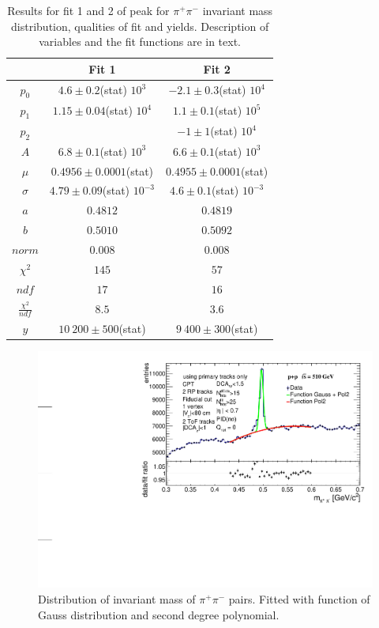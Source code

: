 \FloatBarrier
\begin{table}[ht]
    \centering
        \begin{tabular}{c|c|c}
             & Fit 1 & Fit 2 \\ \hline
           $p_0$ & $4.6 \pm 0.2$(stat) $10^{3}$ & $-2.1 \pm 0.3$(stat) $10^{4}$ \\ \hline
           $p_1$ & $1.15 \pm 0.04$(stat) $10^4$ & $1.1 \pm 0.1$(stat) $10^5$\\ \hline
           $p_2$ & & $-1 \pm 1$(stat) $10^4$ \\ \hline
           $A$ & $6.8 \pm 0.1$(stat) $10^3$ &  $6.6 \pm 0.1$(stat) $10^3$ \\ \hline
           $\mu$ & $0.4956 \pm 0.0001$(stat) &  $0.4955 \pm 0.0001$(stat) \\ \hline
           $\sigma$ & $4.79 \pm 0.09$(stat) $10^{-3}$ &  $4.6 \pm 0.1$(stat) $10^{-3}$ \\ \hline
           $a$ & $0.4812$ & $0.4819$\\ \hline
           $b$ & $0.5010$ & $0.5092$ \\ \hline
           $norm$ & $0.008$ & $0.008$ \\ \hline
           $\chi^2$ & $145$ & $57$ \\ \hline
           $ndf$ & $17$  & $16$ \\ \hline
           $\frac{\chi^2}{ndf}$ & $8.5$ & $3.6$  \\ \hline
           $y$ & $10~200 \pm 500$(stat) & $9~400 \pm 300$(stat)
        \end{tabular}
    \caption[Results for fit 1 and 2 of invariant mass of $\pi^+ \pi^-$ pairs]{Results for fit 1 and 2 of peak for $\pi^+ \pi^-$ invariant mass distribution, qualities of fit and yields. Description of variables and the fit functions are in text.}
    \label{at1}
\end{table}
\FloatBarrier
\FloatBarrier
\begin{figure}[ht]
    \centering
        \includegraphics[width=1\textwidth]{figures/K0sFitQuad.pdf}
        \caption[Distribution of invariant pion pairs fitted with Gauss distribution and 2. degree polynomial]{Distribution of invariant mass of $\pi^+ \pi^-$ pairs. Fitted with function of Gauss distribution and second degree polynomial.}
    \label{af13}
\end{figure}
